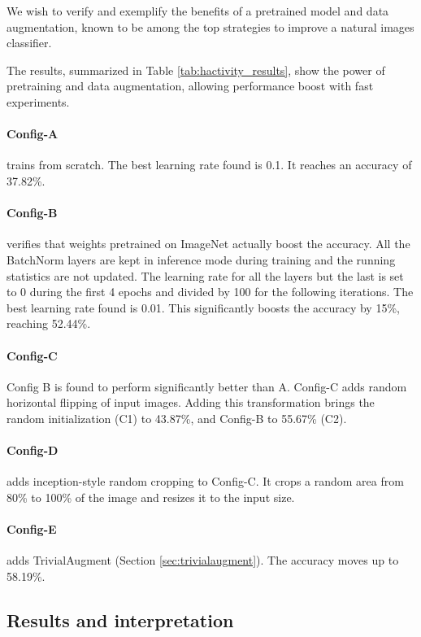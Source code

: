 We wish to verify and exemplify the benefits of a pretrained model and data augmentation, known to be among the top strategies to improve a natural images classifier.

The results, summarized in Table \ref{tab:hactivity_results}, show the power of pretraining and data augmentation, allowing performance boost with fast experiments. 

\paragraph{Config-A} trains from scratch. The best learning rate found is 0.1. It reaches an accuracy of 37.82\%.

\paragraph{Config-B} verifies that weights pretrained on ImageNet actually boost the accuracy. All the BatchNorm layers are kept in inference mode during training and the running statistics are not updated. The learning rate for all the layers but the last is set to 0 during the first 4 epochs and divided by 100 for the following iterations. The best learning rate found is 0.01. This significantly boosts the accuracy by 15\%, reaching 52.44\%.

\paragraph{Config-C} Config B is found to perform significantly better than A. Config-C adds random horizontal flipping of input images. Adding this transformation brings the random initialization (C1) to 43.87\%, and Config-B to 55.67\% (C2).

\paragraph{Config-D} adds inception-style random cropping to Config-C. It crops a random area from 80\% to 100\% of the image and resizes it to the input size.

\paragraph{Config-E} adds TrivialAugment (Section \ref{sec:trivialaugment}). The accuracy moves up to 58.19\%.

\subsection{Results and interpretation}

